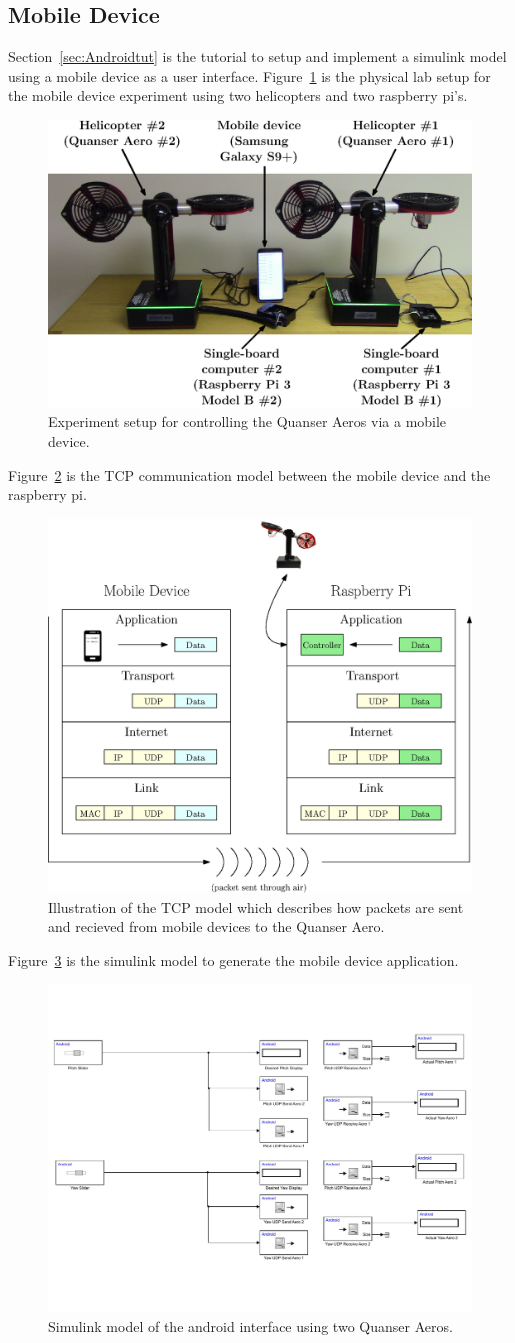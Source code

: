 \subsection{Mobile Device}
Section~\ref{sec:Androidtut} is the tutorial to setup and implement a simulink model using a mobile device as a user interface.  Figure~\ref{fig:Setup} is the physical lab setup for the mobile device experiment using two helicopters and two raspberry pi's. 
\begin{figure}[!htbp]
    \centering
    \includegraphics[width=.5\textwidth,keepaspectratio=true]{figs/ipe/Setup.eps}
    \caption{Experiment setup for controlling the Quanser Aeros via a mobile device.}
    \label{fig:Setup}
\end{figure}
Figure~\ref{fig:TCPModel} is the TCP communication model between the mobile device and the raspberry pi.
\begin{figure}[!htbp]
    \centering
    \includegraphics[width=.46\textwidth,keepaspectratio=true]{figs/ipe/TCPModel.eps}
    \caption{Illustration of the TCP model which describes how packets are sent and recieved from mobile devices to the Quanser Aero.}
    \label{fig:TCPModel}
\end{figure}
Figure~\ref{fig:Android_Interface} is the simulink model to generate the mobile device application.
\begin{figure}[!htbp]
    \centering
    \includegraphics[width=.46\textwidth,keepaspectratio=true]{figs/img/Android_Interface_2Aero}
    \caption{Simulink model of the android interface using two Quanser Aeros.}
    \label{fig:Android_Interface}
\end{figure}
